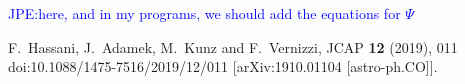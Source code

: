 \documentclass[12pt,a4paper]{article}
\numberwithin{equation}{section}
\theoremstyle{definition} %
\def\JP#1{\textcolor{blue}{JPE:#1}}
\begin{document}
\JP{here, and in my programs, we should add the equations for $\Psi$}

\begin{thebibliography}{11}
\providecommand{\natexlab}[1]{#1}
\providecommand{\url}[1]{\texttt{#1}}
\providecommand{\urlprefix}{URL }

F.~Hassani, J.~Adamek, M.~Kunz and F.~Vernizzi,
JCAP \textbf{12} (2019), 011
doi:10.1088/1475-7516/2019/12/011
[arXiv:1910.01104 [astro-ph.CO]].

\end{thebibliography}
\end{document}
